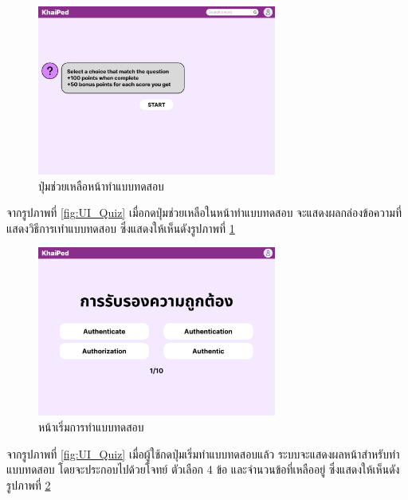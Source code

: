 \documentclass[12pt,oneside,openright,a4paper]{cpe-thai-project}
\begin{document}
\begin{figure}[!h]\centering
	\includegraphics[width=0.7\textwidth, keepaspectratio=true]{image/chap3/ui/quiz/Quiz - Help.png}
	\caption{ปุ่มช่วยเหลือหน้าทำแบบทดสอบ}\label{fig:UI_QuizHelp}
\end{figure}
\hspace{1cm}
จากรูปภาพที่ \ref{fig:UI_Quiz} เมื่อกดปุ่มช่วยเหลือในหน้าทำแบบทดสอบ จะแสดงผลกล่องข้อความที่แสดงวิธีการเทำแบบทดสอบ ซึ่งแสดงให้เห็นดังรูปภาพที่ \ref{fig:UI_QuizHelp}

\pagebreak
\begin{figure}[!h]\centering
	\includegraphics[width=0.7\textwidth, keepaspectratio=true]{image/chap3/ui/quiz/Quiz - Start.png}
	\caption{หน้าเริ่มการทำแบบทดสอบ}\label{fig:UI_QuizStart}
\end{figure}
\hspace{1cm}
จากรูปภาพที่ \ref{fig:UI_Quiz} เมื่อผู้ใช้กดปุ่มเริ่มทำแบบทดสอบแล้ว ระบบจะแสดงผลหน้าสำหรับทำแบบทดสอบ โดยจะประกอบไปด้วยโจทย์
ตัวเลือก 4 ข้อ และจำนวนข้อที่เหลืออยู่ ซึ่งแสดงให้เห็นดังรูปภาพที่ \ref{fig:UI_QuizStart}
\end{document}
